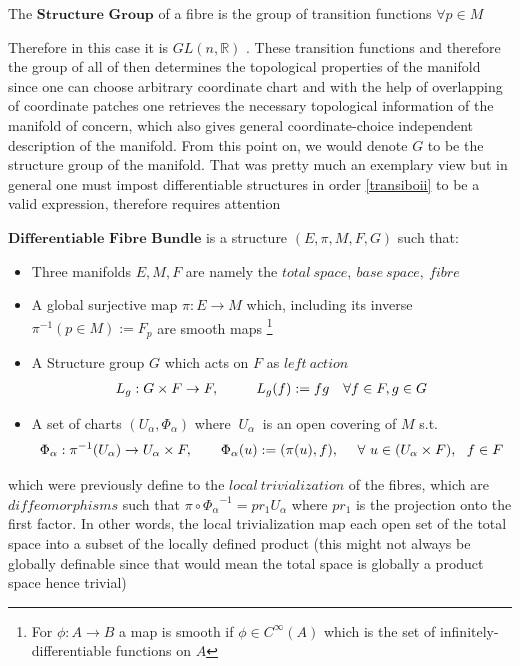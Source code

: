 \documentclass[8pt, twocoloumn]{article}
\begin{document}
\begin{theorem}
The $\textbf{Structure Group}$ of a fibre is the group of transition functions $\forall p \in M$
\end{theorem}
Therefore in this case it is $GL(n, \mathbb{R})$ . These transition functions and therefore the group of all of then determines the topological properties of the manifold since one can choose arbitrary coordinate chart and with the help of overlapping of coordinate patches one retrieves the necessary topological information of the manifold of concern, which also gives general coordinate-choice independent description of the manifold. From this point on, we would denote $G$ to be the structure group of the manifold.
That was pretty much an exemplary view but in general one must impost differentiable structures in order \ref{transiboii} to be a valid expression, therefore requires attention

$\textbf{Differentiable Fibre Bundle}$ is a structure $(E, \pi, M, F, G) $ such that: 
\begin{itemize}
\item Three manifolds $E, M, F$ are namely the $total \ space, \   base \ space, \   fibre$ 
\item  A global surjective map $\pi:E \to M$ which, including its inverse $\pi ^{-1}(p \in M):= F_p $ are smooth maps \footnote{For $\phi: A \to B$ a map is smooth if $\phi \in C^{\infty}(A)$ which is the set of infinitely-differentiable functions on $A$}
\item A Structure group $G$ which acts on $F$ as  $left \ action$  \begin{align}{\label{leftaction}}
L_g : G \times F \to F, \ \ \ \ \ \ \ \ L_g(f):= fg \ \ \ \forall f \in F, g \in G \notag
\end{align} 
\item A set of charts $(U_{\alpha}, \Phi_{\alpha})$ where ${\ U_{\alpha}}\ $ is an open covering of $M$ s.t. \begin{align}
  					\Phi_{\alpha}: \pi^{-1}(U_{\alpha}) \to   U_{\alpha} \times F, \ \ \ \ \ \ \Phi_{\alpha}(u):= (\pi(u), f), \ \ \ \ \forall \ u \in (U_{\alpha} \times F), \  \ f \in F \notag
\end{align}
\end{itemize}
which were previously define to the $local \ trivialization$ of the fibres, which are $diffeomorphisms$ such that $\pi \circ {\Phi_{\alpha}}^{-1} = pr_1 U_{\alpha}$ where $pr_1$ is the projection onto the first factor. In other words, the local trivialization map each open set of the total space into a subset of the locally defined product (this might not always be globally definable since that would mean the total space is globally a product space hence trivial) 
\end{document}
